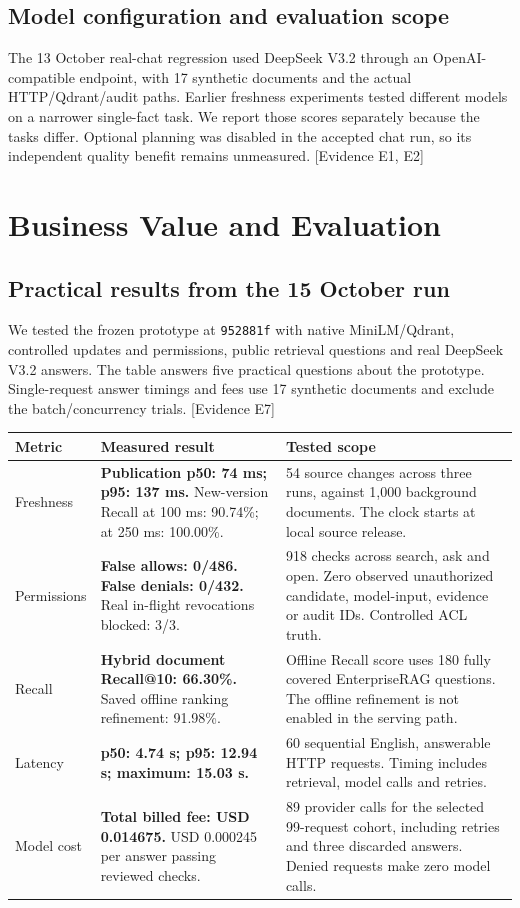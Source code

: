 \documentclass[10pt,a4paper]{article}
\newcommand{\evidence}[1]{{\footnotesize\textcolor{Muted}{[Evidence #1]}}}
\begin{document}
\subsection{Model configuration and evaluation scope}
The 13 October real-chat regression used DeepSeek V3.2 through an OpenAI-compatible endpoint, with 17 synthetic documents and the actual HTTP/Qdrant/audit paths. Earlier freshness experiments tested different models on a narrower single-fact task. We report those scores separately because the tasks differ. Optional planning was disabled in the accepted chat run, so its independent quality benefit remains unmeasured. \evidence{E1, E2}

\clearpage
\section{Business Value and Evaluation}
\subsection{Practical results from the 15 October run}
We tested the frozen prototype at \texttt{952881f} with native MiniLM/Qdrant, controlled updates and permissions, public retrieval questions and real DeepSeek V3.2 answers. The table answers five practical questions about the prototype. Single-request answer timings and fees use 17 synthetic documents and exclude the batch/concurrency trials. \evidence{E7}

\begin{tabularx}{\linewidth}{@{}>{\raggedright\arraybackslash}p{24mm}>{\raggedright\arraybackslash}p{59mm}Y@{}}
\toprule
\textbf{Metric} & \textbf{Measured result} & \textbf{Tested scope} \\
\midrule
Freshness & \textbf{Publication p50: 74 ms; p95: 137 ms.} New-version Recall at 100 ms: 90.74\%; at 250 ms: 100.00\%. & 54 source changes across three runs, against 1,000 background documents. The clock starts at local source release. \\
Permissions & \textbf{False allows: 0/486. False denials: 0/432.} Real in-flight revocations blocked: 3/3. & 918 checks across search, ask and open. Zero observed unauthorized candidate, model-input, evidence or audit IDs. Controlled ACL truth. \\
Recall & \textbf{Hybrid document Recall@10: 66.30\%.} Saved offline ranking refinement: 91.98\%. & Offline Recall score uses 180 fully covered EnterpriseRAG questions. The offline refinement is not enabled in the serving path. \\
Latency & \textbf{p50: 4.74 s; p95: 12.94 s; maximum: 15.03 s.} & 60 sequential English, answerable HTTP requests. Timing includes retrieval, model calls and retries. \\
Model cost & \textbf{Total billed fee: USD 0.014675.} USD 0.000245 per answer passing reviewed checks. & 89 provider calls for the selected 99-request cohort, including retries and three discarded answers. Denied requests make zero model calls. \\
\bottomrule
\end{tabularx}
\end{document}
